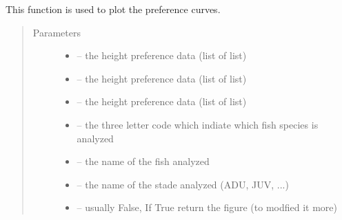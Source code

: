 \documentclass[letterpaper,10pt,english]{sphinxmanual}
\begin{document}
\begin{fulllineitems}
\label{\detokenize{index:src.bio_info.figure_pref}}
This function is used to plot the preference curves.
\begin{quote}\begin{description}
\item[{Parameters}] \leavevmode\begin{itemize}
\item {} 
 -- the height preference data (list of list)

\item {} 
 -- the height preference data (list of list)

\item {} 
 -- the height preference data (list of list)

\item {} 
 -- the three letter code which indiate which fish species is analyzed

\item {} 
 -- the name of the fish analyzed

\item {} 
 -- the name of the stade analyzed (ADU, JUV, ...)

\item {} 
 -- usually False, If True return the figure (to modfied it more)

\end{itemize}

\end{description}\end{quote}

\end{fulllineitems}

\end{document}
